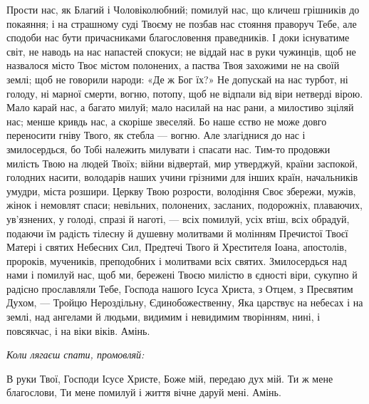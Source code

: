\documentclass[chapters.tex]{subfiles}
\begin{document}
Прости нас, як Благий і Чоловіколюбний; помилуй нас, що кличеш грішників до покаяння; і на страшному суді Твоєму не позбав нас стояння праворуч Тебе, але сподоби нас бути причасниками благословення праведників. І доки існуватиме світ, не наводь на нас напастей спокуси; не віддай нас в руки чужинців, щоб не назвалося місто Твоє містом полонених, а паства Твоя захожими не на своїй землі; щоб не говорили народи: «Де ж Бог їх?» Не допускай на нас турбот, ні голоду, ні марної смерти, вогню, потопу, щоб не відпали від віри нетверді вірою. Мало карай нас, а багато милуй; мало насилай на нас рани, а милостиво зціляй нас; менше кривдь нас, а скоріше звеселяй. Бо наше єство не може довго переносити гніву Твого, як стебла — вогню. Але злагіднися до нас і змилосердься, бо Тобі належить милувати і спасати нас. Тим-то продовжи милість Твою на людей Твоїх; війни відвертай, мир утверджуй, країни заспокой, голодних насити, володарів наших учини грізними для інших країн, начальників умудри, міста розшири. Церкву Твою розрости, володіння Своє збережи, мужів, жінок і немовлят спаси; невільних, полонених, засланих, подорожніх, плаваючих, ув’язнених, у голоді, спразі й наготі, — всіх помилуй, усіх втіш, всіх обрадуй, подаючи їм радість тілесну й душевну молитвами й молінням Пречистої Твоєї Матері і святих Небесних Сил, Предтечі Твого й Хрестителя Іоана, апостолів, пророків, мучеників, преподобних і молитвами всіх святих. Змилосердься над нами і помилуй нас, щоб ми, бережені Твоєю милістю в єдності віри, сукупно й радісно прославляли Тебе, Господа нашого Ісуса Христа, з Отцем, з Пресвятим Духом, — Тройцю Нероздільну, Єдинобожественну, Яка царствує на небесах і на землі, над ангелами й людьми, видимим і невидимим творінням, нині, і повсякчас, і на віки віків. Амінь.

\emph{Коли лягаєш спати, промовляй:}

В руки Твої, Господи Ісусе Христе, Боже мій, передаю дух мій. Ти ж мене благослови, Ти мене помилуй і життя вічне даруй мені. Амінь.
\end{document}
